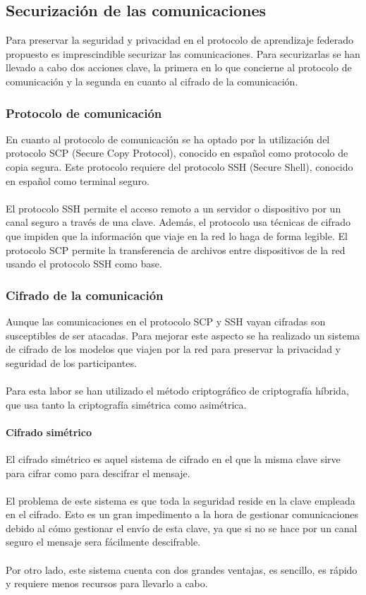 \subsection{Securización de las comunicaciones}
Para preservar la seguridad y privacidad en el protocolo de aprendizaje federado propuesto es imprescindible securizar las comunicaciones. Para securizarlas se han llevado a cabo dos acciones clave, la primera en lo que concierne al protocolo de comunicación y la segunda en cuanto al cifrado de la comunicación.

\subsubsection{Protocolo de comunicación}
En cuanto al protocolo de comunicación se ha optado por la utilización del protocolo SCP (Secure Copy Protocol), conocido en español como protocolo de copia segura. Este protocolo requiere del protocolo SSH (Secure Shell), conocido en español como terminal seguro.
\\ \\
El protocolo SSH permite el acceso remoto a un servidor o dispositivo por un canal seguro a través de una clave. Además, el protocolo usa técnicas de cifrado que impiden que la información que viaje en la red lo haga de forma legible. El protocolo SCP permite la transferencia de archivos entre dispositivos de la red usando el protocolo SSH como base.

\subsubsection{Cifrado de la comunicación}
Aunque las comunicaciones en el protocolo SCP y SSH vayan cifradas son susceptibles de ser atacadas. Para mejorar este aspecto se ha realizado un sistema de cifrado de los modelos que viajen por la red para preservar la privacidad y seguridad de los participantes.
\\ \\ 
Para esta labor se han utilizado el método criptográfico de criptografía híbrida, que usa tanto la criptografía simétrica como asimétrica.

\paragraph{Cifrado simétrico} 
El cifrado simétrico es aquel sistema de cifrado en el que la misma clave sirve para cifrar como para descifrar el mensaje. 
\\ \\
El problema de este sistema es que toda la seguridad reside en la clave empleada en el cifrado. Esto es un gran impedimento a la hora de gestionar comunicaciones debido al cómo gestionar el envío de esta clave, ya que si no se hace por un canal seguro el mensaje sera fácilmente descifrable.
\\ \\
Por otro lado, este sistema cuenta con dos grandes ventajas, es sencillo, es rápido y requiere menos recursos para llevarlo a cabo.

